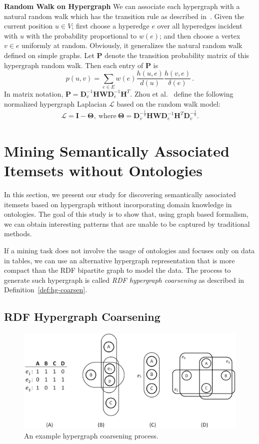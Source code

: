 \textbf{Random Walk on Hypergraph}
\label{sec:rw_hyper}
We can associate each hypergraph with a natural random walk which has the transition rule as described in~\cite{Zhou06learningwith}. Given the current position $u \in V$; first choose a hyperedge $e$ over all hyperedges incident with $u$ with the probability proportional to $w(e)$; and then choose a vertex $v \in e$ uniformly at random. Obviously, it generalizes the natural random walk defined on simple graphs. Let $\mathbf{P}$ denote the transition probability matrix of this hypergraph random walk.
Then each entry of $\mathbf{P}$ is
\[
p(u,v) = \sum_{e\in E}{w(e)\frac{h(u,e)}{d(u)}\frac{h(v,e)}{\delta(e)}}\, .
\]
In matrix notation, $\mathbf{P}=\mathbf{D}_v^{-1}\mathbf{HWD}_e^{-1}\mathbf{H}^T$.
Zhou et al.~\cite{Zhou06learningwith} define the following normalized hypergraph Laplacian $\mathcal{L}$ based on the random walk model:
\begin{align}
\mathcal{L}=\mathbf{I}-\mathbf{\Theta},   ~\mathrm{where}~ \mathbf{\Theta}=\mathbf{D}_v^{-\frac12}\mathbf{HWD}_e^{-1}\mathbf{H}^T\mathbf{D}_v^{-\frac12} \label{eq:normalizedHyperL}.
\end{align}

\section{Mining Semantically Associated Itemsets without Ontologies}
In this section, we present our study for discovering semantically associated itemsets based on hypergraph without incorporating domain knowledge in ontologies. The goal of this study is to show that, using graph based formalism, we can obtain interesting patterns that are unable to be captured by traditional methods.

If a mining task does not involve the usage of ontologies and focuses only on data in tables, we can use an alternative hypergraph representation that is more compact than the RDF bipartite graph to model the data. The process to generate such hypergraph is called \emph{RDF hypergraph coarsening} as described in Definition~\ref{def:hg-coarsen}.

\subsection{RDF Hypergraph Coarsening}

\begin{figure}[tbh]
\centering
\includegraphics[width=\textwidth]{fig/hypergraph-coarsening.eps}
\caption{\label{fig:hypergraph-coarsening} An example hypergraph coarsening process.}
\end{figure}

